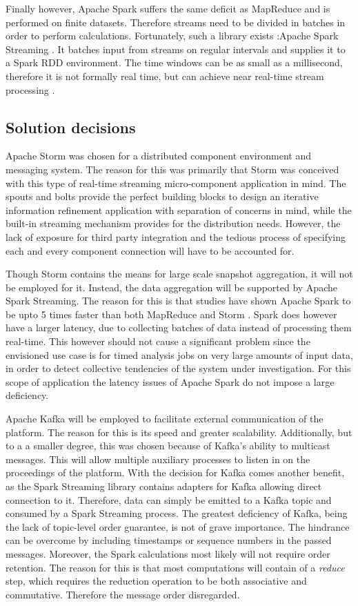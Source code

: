 Finally however, Apache Spark suffers the same deficit as MapReduce and is performed on finite datasets. Therefore streams need to be divided in batches in order to perform calculations. Fortunately, such a library exists :Apache Spark Streaming \cite{web:spark_streaming}. It batches input from streams on regular intervals and supplies it to a Spark RDD environment. The time windows can be as small as a millisecond, therefore it is not formally real time, but can achieve near real-time stream processing \cite{dstreams}.


\subsection{Solution decisions}
\label{sec:solution_decision}
Apache Storm was chosen for a distributed component environment and messaging system. The reason for this was primarily that Storm was conceived with this type of real-time streaming micro-component application in mind. The spouts and bolts provide the perfect building blocks to design an iterative information refinement application with separation of concerns in mind, while the built-in streaming mechanism provides for the distribution needs. However, the lack of exposure for third party integration and the tedious process of specifying each and every component connection will have to be accounted for.

Though Storm contains the means for large scale snapshot aggregation, it will not be employed for it. Instead, the data aggregation will be supported by Apache Spark Streaming. The reason for this is that studies have shown Apache Spark to be upto 5 times faster than both MapReduce \cite{mapreduce_vs_spark} and Storm \cite{spark_vs_storm}. Spark does however have a larger latency, due to collecting batches of data instead of processing them real-time. This however should not cause a significant problem since the envisioned use case is for timed analysis jobs on very large amounts of input data, in order to detect collective tendencies of the system under investigation. For this scope of application the latency issues of Apache Spark do not impose a large deficiency.

Apache Kafka will be employed to facilitate external communication of the platform. The reason for this is its speed and greater scalability. Additionally, but to a a smaller degree, this was chosen because of Kafka's ability to multicast messages. This will allow multiple auxiliary processes to listen in on the proceedings of the platform. With the decision for Kafka comes another benefit, as the Spark Streaming library contains adapters for Kafka allowing direct connection to it. Therefore, data can simply be emitted to a Kafka topic and consumed by a Spark Streaming process. The greatest deficiency of Kafka, being the lack of topic-level order guarantee, is not of grave importance. The hindrance can be overcome by including timestamps or sequence numbers in the passed messages. Moreover, the Spark calculations most likely will not require order retention. The reason for this is that most computations will contain of a \emph{reduce} step, which requires the reduction operation to be both associative and commutative. Therefore the message order disregarded.

